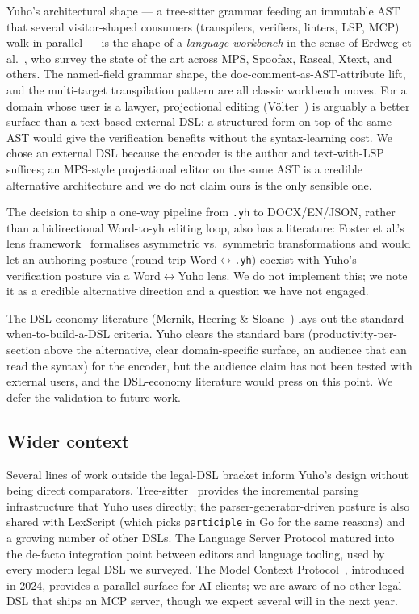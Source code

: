 Yuho's architectural shape --- a tree-sitter grammar feeding an
immutable AST that several visitor-shaped consumers (transpilers,
verifiers, linters, LSP, MCP) walk in parallel --- is the shape of a
\emph{language workbench} in the sense of Erdweg et
al.~\cite{erdweg2015workbenches}, who survey the state of the art
across MPS, Spoofax, Rascal, Xtext, and others. The named-field
grammar shape, the doc-comment-as-AST-attribute lift, and the
multi-target transpilation pattern are all classic workbench moves.
For a domain whose user is a lawyer, projectional editing
(V\"olter~\cite{voelter2014mps}) is arguably a better surface than a
text-based external DSL: a structured form on top of the same AST
would give the verification benefits without the syntax-learning cost.
We chose an external DSL because the encoder is the author and
text-with-LSP suffices; an MPS-style projectional editor on the same
AST is a credible alternative architecture and we do not claim ours
is the only sensible one.

The decision to ship a one-way pipeline from \texttt{.yh} to
DOCX/EN/JSON, rather than a bidirectional Word-to-yh editing loop,
also has a literature: Foster et al.'s lens
framework~\cite{foster2007combinators} formalises asymmetric vs.\
symmetric transformations and would let an authoring posture
(round-trip Word$\leftrightarrow$\texttt{.yh}) coexist with Yuho's
verification posture via a Word$\leftrightarrow$Yuho
lens. We do not implement this; we note it as a credible alternative
direction and a question we have not engaged.

The DSL-economy literature (Mernik, Heering \&
Sloane~\cite{mernik2005dsl}) lays out the standard
when-to-build-a-DSL criteria. Yuho clears the standard bars
(productivity-per-section above the alternative, clear
domain-specific surface, an audience that can read the syntax) for
the encoder, but the audience claim has not been tested with external
users, and the DSL-economy literature would press on this point. We
defer the validation to future work.

\subsection{Wider context}
\label{subsec:rel_wider}

Several lines of work outside the legal-DSL bracket inform Yuho's
design without being direct comparators. Tree-sitter~\cite{treesitter}
provides the incremental parsing infrastructure that Yuho uses
directly; the parser-generator-driven posture is also shared with
LexScript (which picks \texttt{participle} in Go for the same
reasons) and a growing number of other DSLs. The Language Server
Protocol matured into the de-facto integration point between
editors and language tooling, used by every modern legal DSL we
surveyed. The Model Context Protocol~\cite{mcp2024}, introduced in
2024, provides a parallel surface for AI clients; we are aware of
no other legal DSL that ships an MCP server, though we expect
several will in the next year.

